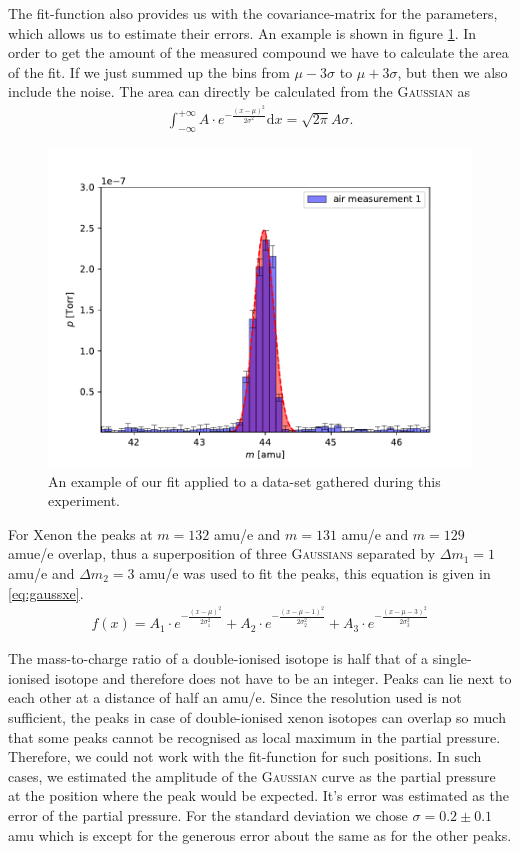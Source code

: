 The fit-function also provides us with the covariance-matrix for the parameters, which allows us to estimate their errors.  
An example is shown in figure \ref{fig:gauss_int}. In order to get the amount of the measured compound we have to calculate the area of the fit. If we just summed up the bins from $\mu-3\sigma$ to $\mu+3\sigma$, but then we also include the noise. The area can directly be calculated from the {\scshape Gaussian} as
\begin{align}
    \int_{-\infty}^{+\infty} A\cdot e^{-\frac{(x-\mu)^2}{2\sigma^2}} \mathrm{d}x = \sqrt{2\pi}A\sigma. \label{eq:gauss_int} 
\end{align}
\begin{figure}[h!]
    \centering
    \includegraphics[width=\textwidth]{Report/DataResultsPlots/peak.pdf}
    \caption{An example of our fit applied to a data-set gathered during this experiment.}
    \label{fig:gauss_int}
\end{figure}
For Xenon the peaks at $m=132$ amu/e and $m=131$ amu/e and $m=129$ amue/e overlap, thus a superposition of three {\scshape Gaussians} separated by $\Delta m_1 = 1$ amu/e and $\Delta m_2 = 3$ amu/e was used to fit the peaks, this equation is given in \eqref{eq:gaussxe}.
\begin{align}
    f(x) = A_1\cdot e^{-\frac{(x-\mu)^2}{2\sigma_1^2}} + A_2\cdot e^{-\frac{(x-\mu - 1)^2}{2\sigma_2^2}} + A_3\cdot e^{-\frac{(x-\mu-3)^2}{2\sigma_3^2}} \label{eq:gaussxe}
\end{align}

The mass-to-charge ratio of a double-ionised isotope is half that of a single-ionised isotope and therefore does not have to be an integer. Peaks can lie next to each other at a distance of half an amu/e.  Since the resolution used is not sufficient, the peaks in case of double-ionised xenon isotopes can overlap so much that some peaks cannot be recognised as local maximum in the partial pressure. Therefore, we could not work with the fit-function for such positions. In such cases, we estimated the amplitude of the {\scshape Gaussian} curve as the partial pressure at the position where the peak would be expected. It's error was estimated as the error of the partial pressure.  For the standard deviation we chose $\sigma = 0.2 \pm 0.1$ amu which is except for the generous error about the same as for the other peaks. 

